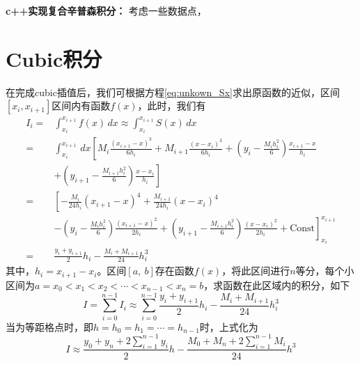 \begin{example}
	\textbf{c++实现复合辛普森积分：} 考虑一些数据点，
	
\end{example}

\section{Cubic积分}
在完成cubic插值后，我们可根据方程\eqref{eq:unkown_Sx}求出原函数的近似，区间$[x_i, x_{i+1}]$区间内有函数$f(x)$，此时，我们有
\begin{equation}
	\begin{aligned}
		I_i =& \int_{x_i}^{x_{i+1}} f(x) \, dx \approx \int_{x_i}^{x_{i+1}} S(x) \, dx \\
		=& \int_{x_i}^{x_{i+1}} \, dx \left[ M_i \frac{\left(x_{i+1}-x\right)^3}{6 h_i}+M_{i+1} \frac{\left(x-x_i\right)^3}{6 h_i}+\left(y_i-\frac{M_i h_i^2}{6}\right) \frac{x_{i+1}-x}{h_i} \right. \\
		 &\left. + \left(y_{i+1}-\frac{M_{i+1} h_i^2}{6}\right) \frac{x-x_i}{h_i} \right]	\\
		=& \left[ -\frac{M_i}{24h_i} \left(x_{i+1}-x\right)^4 + \frac{M_{i+1}}{24h_i}\left(x-x_i\right)^4 \right. \\
		 &\left. -\left(y_i-\frac{M_i h_i^2}{6}\right) \frac{(x_{i+1}-x)^2}{2h_i} + \left(y_{i+1}-\frac{M_{i+1} h_i^2}{6}\right) \frac{(x-x_i)^2}{2h_i} + \text{Const} \right]_{x_i}^{x_{i+1}}	\\
		=& \frac{y_i + y_{i+1}}{2} h_i - \frac{M_{i} + M_{i+1}}{24} h_i^3
	\end{aligned}
\end{equation} 
其中，$h_i = x_{i+1}-x_{i}$。区间$[a,\ b]$存在函数$f(x)$，将此区间进行$n$等分，每个小区间为$a = x_0 < x_1 < x_2 < \cdots < x_{n-1} < x_n = b $，求函数在此区域内的积分，如下
\begin{equation}
	I = \sum_{i=0}^{n-1} I_{i} \approx \sum_{i=0}^{n-1} \frac{y_i + y_{i+1}}{2} h_i - \frac{M_{i} + M_{i+1}}{24} h_i^3
\end{equation} 
当为等距格点时，即$h = h_0 = h_1 =\cdots = h_{n-1}$时，上式化为
\begin{equation}
	I \approx \frac{y_0 + y_n + 2\sum_{i=1}^{n-1}y_i}{2} h - \frac{M_0 + M_n + 2\sum_{i=1}^{n-1}M_i}{24} h^3
\end{equation} 








